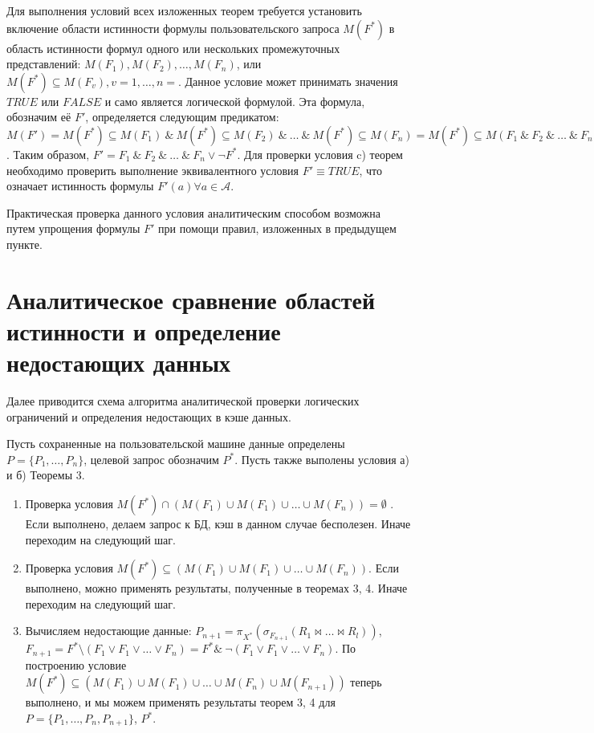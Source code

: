\documentclass[10pt,a4paper]{article}
\def \n #1{\mathit{#1}}
\begin{document}
Для выполнения условий всех изложенных теорем требуется установить включение области истинности
формулы пользовательского запроса $M(F^{\ast})$ в область истинности формул одного или нескольких
промежуточных представлений: $M(F_1), M(F_2), \dots, M(F_n)$, или $M(F^{\ast}) \subseteq M(F_{v}),
v = 1,\dots, n = $. Данное условие может принимать значения $TRUE$ или $FALSE$ и само является
логической формулой. Эта формула, обозначим её $F'$, определяется следующим предикатом: $M(F') =
M(F^{\ast}) \subseteq M(F_1)\ \&\ M(F^{\ast}) \subseteq M(F_2)\ \&\ \dots\ \&\ M(F^{\ast})
\subseteq M(F_n) = M(F^{\ast}) \subseteq M(F_1\ \&\ F_2\ \&\ \dots\ \&\ F_n) = M(F^{\ast}
\rightarrow F_1\ \&\ F_2\ \&\ \dots\ \&\ F_n) = 
M(F_1\ \&\ F_2\ \&\ \dots\ \&\ F_n \vee \neg F^{\ast})$. Таким образом, $F' = F_1\ \&\ F_2\ \&\
\dots\ \&\ F_n \vee \neg F^{\ast}$. Для проверки условия c) теорем необходимо проверить выполнение
эквивалентного условия $F' \equiv \n{TRUE}$, что означает истинность формулы $F'(a) \forall a \in
\mathcal{A}$.

Практическая проверка данного условия аналитическим способом возможна путем упрощения формулы $F'$
при помощи правил, изложенных в предыдущем пункте.


\section{Аналитическое сравнение областей истинности и определение недостающих данных}
Далее приводится схема алгоритма аналитической проверки логических ограничений и определения
недостающих в кэше данных.

Пусть сохраненные на пользовательской машине данные определены $P = \{P_1,
\dots, P_n\}$, целевой запрос обозначим $P^{\ast}$. Пусть также выполены условия а) и б) Теоремы 3.

\begin{enumerate}[label=\bfseries Шаг \arabic*:]
  \item Проверка условия $M(F^{\ast}) \cap (M(F_1) \cup M(F_1) \cup \dots \cup M(F_n)) = \emptyset $
  . Если выполнено, делаем запрос к БД, кэш в данном случае бесполезен. Иначе переходим на
  следующий шаг.
  \item Проверка условия $M(F^{\ast}) \subseteq (M(F_1) \cup M(F_1) \cup \dots \cup M(F_n))$. Если
  выполнено, можно применять результаты, полученные в теоремах 3, 4. Иначе переходим
  на следующий шаг.
  \item Вычисляем недостающие данные: $P_{n + 1} = \pi_{X^{\ast}} (\sigma_{F_{n + 1}} (R_1 \Join
  \dots \Join R_l))$, $F_{n + 1} = F^{\ast} \setminus (F_1 \vee F_1 \vee \dots \vee F_n) =
  F^{\ast} \&\ \neg(F_1 \vee F_1 \vee \dots \vee F_n) $. По построению условие $M(F^{\ast})
  \subseteq (M(F_1) \cup M(F_1) \cup \dots \cup M(F_n) \cup M(F_{n + 1}))$ теперь выполнено, и мы
  можем применять результаты теорем 3, 4 для $P = \{P_1, \dots, P_n, P_{n + 1}\}$, $P^{\ast}$.
\end{enumerate}
\end{document}
